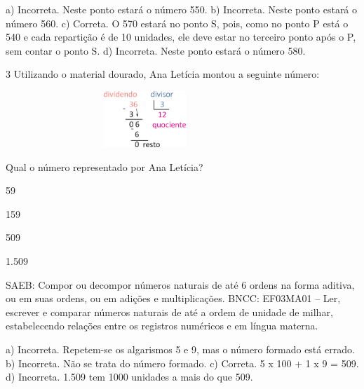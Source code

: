 a) Incorreta. Neste ponto estará o número 550.
b) Incorreta. Neste ponto estará o número 560.
c) Correta. O 570 estará no ponto S, pois, como no ponto P está o 540 e cada
repartição é de 10 unidades, ele deve estar no terceiro ponto após o P,
sem contar o ponto S.
d) Incorreta. Neste ponto estará o número 580.

\num{3} Utilizando o material dourado, Ana Letícia montou a seguinte número:

\includegraphics[width=4.13369in,height=0.83341in]{media/image13.png}


Qual o número representado por Ana Letícia?

\begin{escolha}

\item
  59
\item
  159
\item
  509
\item
  1.509
\end{escolha}

SAEB: Compor ou decompor números naturais de até 6 ordens na forma aditiva, ou em suas ordens, ou em adições e multiplicações.
BNCC: EF03MA01 -- Ler, escrever e comparar números naturais de até a ordem de unidade de milhar, estabelecendo relações entre os registros numéricos e em língua materna.

a) Incorreta. Repetem-se os algarismos 5 e 9, mas o número formado está errado.
b) Incorreta. Não se trata do número formado.
c) Correta. 5 x 100 + 1 x 9 = 509.
d) Incorreta. 1.509 tem 1000 unidades a mais do que 509.

\chapter{}


